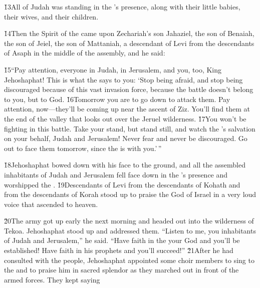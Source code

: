 \v{13}All of Judah was standing in the 's presence, along with their little babies, their wives, and their children.

\v{14}Then the Spirit of the  came upon Zechariah's son Jahaziel, the son of Benaiah, the son of Jeiel, the son of Mattaniah, a descendant of Levi from the descendants of Asaph in the middle of the assembly, and he said:

\begin{poetry}
\poeml \v{15}``Pay attention, everyone in Judah, in Jerusalem, and you, too, King Jehoshaphat! This is what the  says to you: `Stop being afraid, and stop being discouraged because of this vast invasion force, because the battle doesn't belong to you, but to God. \v{16}Tomorrow you are to go down to attack them. Pay attention, now---they'll be coming up near the ascent of Ziz. You'll find them at the end of the valley that looks out over the Jeruel wilderness. \v{17}You won't be fighting in this battle. Take your stand, but stand still, and watch the 's salvation on your behalf, Judah and Jerusalem! Never fear and never be discouraged. Go out to face them tomorrow, since the  is with you.'\,''
\end{poetry}

\v{18}Jehoshaphat bowed down with his face to the ground, and all the assembled inhabitants of Judah and Jerusalem fell face down in the 's presence and worshipped the . \v{19}Descendants of Levi from the descendants of Kohath and from the descendants of Korah stood up to praise the  God of Israel in a very loud voice that ascended to heaven.

\v{20}The army got up early the next morning and headed out into the wilderness of Tekoa. Jehoshaphat stood up and addressed them. ``Listen to me, you inhabitants of Judah and Jerusalem,'' he said. ``Have faith in the  your God and you'll be established! Have faith in his prophets and you'll succeed!'' \v{21}After he had consulted with the people, Jehoshaphat appointed some choir members to sing to the  and to praise him in sacred splendor as they marched out in front of the armed forces. They kept saying

